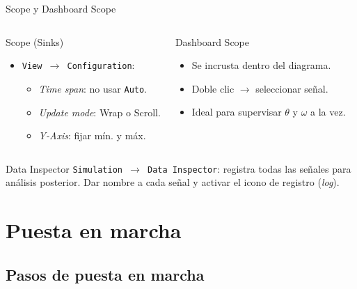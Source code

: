 \documentclass{beamer}
\begin{document}
\begin{frame}{Scope y Dashboard Scope}
\begin{columns}[T]
  \begin{block}{Scope (Sinks)}
    \begin{itemize}
      \item \texttt{View $\to$ Configuration}:
        \begin{itemize}\small
          \item \textit{Time span}: no usar \texttt{Auto}.
          \item \textit{Update mode}: Wrap o Scroll.
          \item \textit{Y-Axis}: fijar mín. y máx.
        \end{itemize}
    \end{itemize}
  \end{block}
  \begin{block}{Dashboard Scope}
    \begin{itemize}
      \item Se incrusta dentro del diagrama.
      \item Doble clic $\to$ seleccionar señal.
      \item Ideal para supervisar $\theta$ y $\omega$ a la vez.
    \end{itemize}
  \end{block}
\end{columns}
\vspace{6pt}
\begin{block}{Data Inspector}
  \texttt{Simulation $\to$ Data Inspector}: registra todas las señales
  para análisis posterior. Dar nombre a cada señal y activar el icono de
  registro (\emph{log}).
\end{block}
\end{frame}

\section{Puesta en marcha}

\subsection{Pasos de puesta en marcha}
\end{document}
